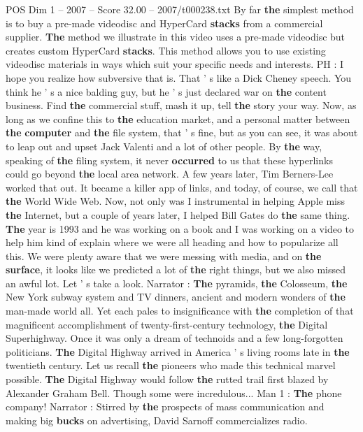\begin{textsample}{POS Dim 1 – 2007 – Score 32.00 – 2007/t000238.txt}
By far \textbf{the} simplest method is to buy a pre-made videodisc and HyperCard \textbf{stacks} from a commercial supplier. \textbf{The} method we illustrate in this video uses a pre-made videodisc but creates custom HyperCard \textbf{stacks}.
This method allows you to use existing videodisc materials in ways which suit your specific needs and interests.
PH : I hope you realize how subversive that is.
That ' s like a Dick Cheney speech.
You think he ' s a nice balding guy, but he ' s just declared war on \textbf{the} content business.
Find \textbf{the} commercial stuff, mash it up, tell \textbf{the} story your way.
Now, as long as we confine this to \textbf{the} education market, and a personal matter between \textbf{the} \textbf{computer} and \textbf{the} file system, that ' s fine, but as you can see, it was about to leap out and upset Jack Valenti and a lot of other people.
By \textbf{the} way, speaking of \textbf{the} filing system, it never \textbf{occurred} to us that these hyperlinks could go beyond \textbf{the} local area network.
A few years later, Tim Berners-Lee worked that out.
It became a killer app of links, and today, of course, we call that \textbf{the} World Wide Web.
Now, not only was I instrumental in helping Apple miss \textbf{the} Internet, but a couple of years later, I helped Bill Gates do \textbf{the} same thing. \textbf{The} year is 1993 and he was working on a book and I was working on a video to help him kind of explain where we were all heading and how to popularize all this.
We were plenty aware that we were messing with media, and on \textbf{the} \textbf{surface}, it looks like we predicted a lot of \textbf{the} right things, but we also missed an awful lot.
Let ' s take a look.
Narrator : \textbf{The} pyramids, \textbf{the} Colosseum, \textbf{the} New York subway system and TV dinners, ancient and modern wonders of \textbf{the} man-made world all.
Yet each pales to insignificance with \textbf{the} completion of that magnificent accomplishment of twenty-first-century technology, \textbf{the} Digital Superhighway.
Once it was only a dream of technoids and a few long-forgotten politicians. \textbf{The} Digital Highway arrived in America ' s living rooms late in \textbf{the} twentieth century.
Let us recall \textbf{the} pioneers who made this technical marvel possible. \textbf{The} Digital Highway would follow \textbf{the} rutted trail first blazed by Alexander Graham Bell.
Though some were incredulous...
Man 1 : \textbf{The} phone company!
Narrator : Stirred by \textbf{the} prospects of mass communication and making big \textbf{bucks} on advertising, David Sarnoff commercializes radio.

\end{textsample}
